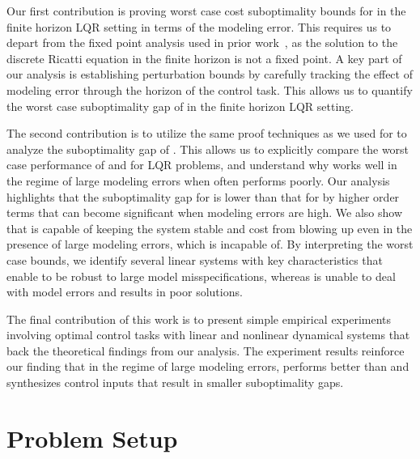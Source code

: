 
Our first contribution is proving worst case cost suboptimality bounds for
\MM{} in the finite horizon LQR setting in terms of the modeling error. This
requires us to depart from the fixed point analysis used in prior
work~\cite{mania19, konstantinov93}, as the
solution to the discrete Ricatti equation in the finite horizon is not a fixed
point. A key part of our analysis is establishing perturbation bounds by
carefully tracking the effect of modeling error through the horizon of the
control task. This allows us to quantify the worst case suboptimality gap of \MM{} in the
finite horizon LQR setting.

The second contribution is to utilize the same proof techniques as we used for
\MM{} to analyze the
suboptimality gap of \ILC{}. This allows us to explicitly compare the
worst case performance of
\ILC{} and \MM{} for LQR problems, and understand why \ILC{} works well in the regime of
large modeling errors when \MM{} often performs poorly.
Our analysis highlights that the suboptimality gap for \ILC{} is lower than that
for \MM{} by higher order terms that can become significant
when modeling errors are high. We also show that \ILC{} is capable of keeping the
system stable and cost from blowing up even in the presence of large modeling
errors, which \MM{} is incapable of. By interpreting the worst case
bounds, we identify several linear systems
with key characteristics that enable \ILC{} to be robust to large model
misspecifications, whereas \MM{} is unable to deal with model errors and
results in poor solutions.

The final contribution of this work is to present simple empirical experiments
involving optimal control tasks with linear and nonlinear dynamical systems that
back the theoretical findings from our analysis. The experiment results
reinforce our finding that in the regime of large modeling errors, \ILC{} performs
better than \MM{} and synthesizes control inputs that result in smaller suboptimality
gaps.

\section{Problem Setup}
\label{sec:problem-setup}

